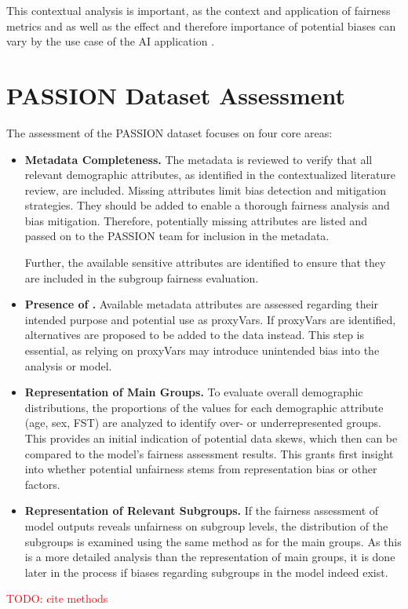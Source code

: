 \documentclass[12pt, a4paper, oneside]{book}   	%
\renewcommand{\todo}[1]{\textcolor{red}{TODO: #1}}
\begin{document}
		This contextual analysis is important, as the context and application of fairness metrics and as well as the effect and therefore importance of potential biases can vary by the use case of the \gls{AI} application \autocite{Mehrabi_2021,Barr_2025}.
		
		\section{PASSION Dataset Assessment}\label{chap:datasetAssessmentMethod}
		The assessment of the PASSION dataset focuses on four core areas:
		
		\begin{itemize}
			\item \textbf{Metadata Completeness.} The metadata is reviewed to verify that all relevant demographic attributes, as identified in the contextualized literature review, are included. Missing attributes limit bias detection and mitigation strategies. They should be added to enable a thorough fairness analysis and bias mitigation. Therefore, potentially missing attributes are listed and passed on to the PASSION team for inclusion in the metadata.
			
			Further, the available sensitive attributes are identified to ensure that they are included in the subgroup fairness evaluation.
			
			\item \textbf{Presence of .} Available metadata attributes are assessed regarding their intended purpose and potential use as \glspl{proxyVar}. If \glspl{proxyVar} are identified, alternatives are proposed to be added to the data instead. This step is essential, as relying on \glspl{proxyVar} may introduce unintended bias into the analysis or model.
			
			\item \textbf{Representation of Main Groups.} To evaluate overall demographic distributions, the proportions of the values for each demographic attribute (age, sex, \gls{FST}) are analyzed to identify over- or underrepresented groups. This provides an initial indication of potential data skews, which then can be compared to the model's fairness assessment results. This grants first insight into whether potential unfairness stems from representation bias or other factors.
			
			\item \textbf{Representation of Relevant Subgroups.}
			If the fairness assessment of model outputs reveals unfairness on subgroup levels, the distribution of the subgroups is examined using the same method as for the main groups. As this is a more detailed analysis than the representation of main groups, it is done later in the process if biases regarding subgroups in the model indeed exist.
		\end{itemize}
		\todo{cite methods}
		
\end{document}
